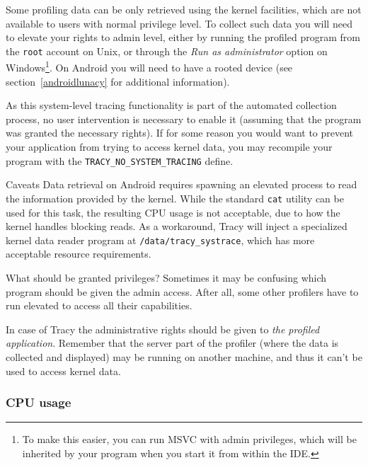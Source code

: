 \documentclass[hidelinks,titlepage,a4paper]{article}
\begin{document}
Some profiling data can be only retrieved using the kernel facilities, which are not available to users with normal privilege level. To collect such data you will need to elevate your rights to admin level, either by running the profiled program from the \texttt{root} account on Unix, or through the \emph{Run as administrator} option on Windows\footnote{To make this easier, you can run MSVC with admin privileges, which will be inherited by your program when you start it from within the IDE.}. On Android you will need to have a rooted device (see section~\ref{androidlunacy} for additional information).

As this system-level tracing functionality is part of the automated collection process, no user intervention is necessary to enable it (assuming that the program was granted the necessary rights). If for some reason you would want to prevent your application from trying to access kernel data, you may recompile your program with the \texttt{TRACY\_NO\_SYSTEM\_TRACING} define.

\begin{bclogo}[
noborder=true,
couleur=black!5,
logo=\bcattention
]{Caveats}
Data retrieval on Android requires spawning an elevated process to read the information provided by the kernel. While the standard \texttt{cat} utility can be used for this task, the resulting CPU usage is not acceptable, due to how the kernel handles blocking reads. As a workaround, Tracy will inject a specialized kernel data reader program at \texttt{/data/tracy\_systrace}, which has more acceptable resource requirements.
\end{bclogo}

\begin{bclogo}[
noborder=true,
couleur=black!5,
logo=\bclampe
]{What should be granted privileges?}
Sometimes it may be confusing which program should be given the admin access. After all, some other profilers have to run elevated to access all their capabilities.

In case of Tracy the administrative rights should be given to \emph{the profiled application}. Remember that the server part of the profiler (where the data is collected and displayed) may be running on another machine, and thus it can't be used to access kernel data.
\end{bclogo}

\subsubsection{CPU usage}
\end{document}

